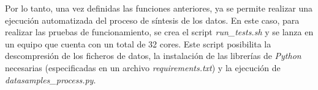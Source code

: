 \vspace{3mm}

Por lo tanto, una vez definidas las funciones anteriores, ya se permite realizar una ejecución automatizada del proceso de síntesis de los datos. En este caso, para realizar las pruebas de funcionamiento, se crea el script \textit{run\_tests.sh} y se lanza en un equipo que cuenta con un total de 32 cores. Este script posibilita la descompresión de los ficheros de datos, la instalación de las librerías de \textit{Python} necesarias (especificadas en un archivo \textit{requirements.txt}) y la ejecución de \textit{datasamples\_process.py}.

\vspace{3mm}


  
  
  
  
  
  
  
